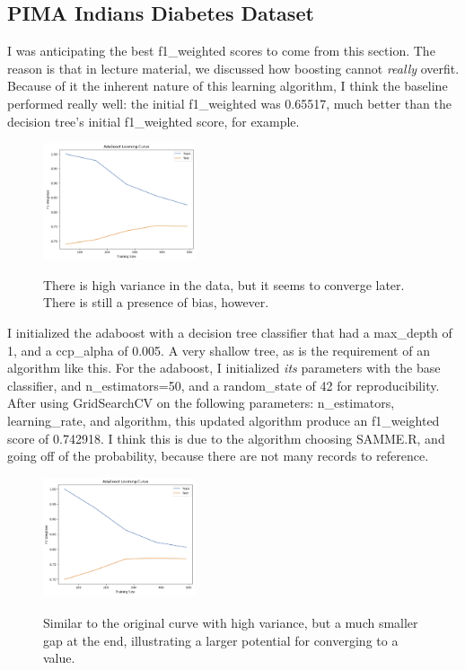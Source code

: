 \documentclass[conference]{IEEEtran}
\begin{document}
\subsection{\textbf{PIMA Indians Diabetes Dataset}}\label{AA}
I was anticipating the best f1\_weighted scores to come from this section. The reason is that in lecture material, we discussed how boosting cannot {\emph{really}} overfit. Because of it the inherent nature of this learning algorithm, I think the baseline performed really well: the initial f1\_weighted was 0.65517, much better than the decision tree's initial f1\_weighted score, for example. 

\begin{figure}[H]
    \centering
    \includegraphics[width=0.40\textwidth]{PIMA Indian Diabetes Graphs/Adaboost/ada init lc.png}
    \label{fig:enter-label}
    \caption{There is high variance in the data, but it seems to converge later. There is still a presence of bias, however.}
\end{figure}

I initialized the adaboost with a decision tree classifier that had a max\_depth of 1, and a ccp\_alpha of 0.005. A very shallow tree, as is the requirement of an algorithm like this. For the adaboost, I initialized {\emph{its}} parameters with the base classifier, and n\_estimators=50, and a random\_state of 42 for reproducibility. After using GridSearchCV on the following parameters: n\_estimators, learning\_rate, and algorithm, this updated algorithm produce an f1\_weighted score of 0.742918. I think this is due to the algorithm choosing SAMME.R, and going off of the probability, because there are not many records to reference. 

\begin{figure}[H]
    \centering
    \includegraphics[width=0.40\textwidth]{PIMA Indian Diabetes Graphs/Adaboost/ada fin lc.png}
    \label{fig:enter-label}
    \caption{Similar to the original curve with high variance, but a much smaller gap at the end, illustrating a larger potential for converging to a value.}
\end{figure}
\end{document}
